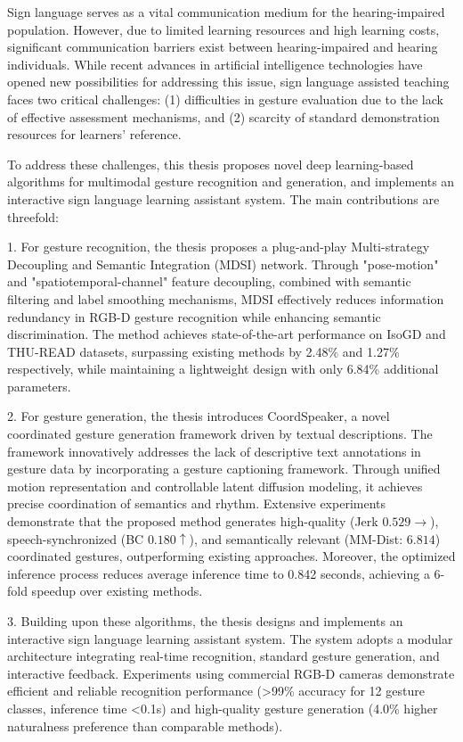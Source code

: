 \begin{abstract*}
Sign language serves as a vital communication medium for the hearing-impaired population. However, due to limited learning resources and high learning costs, significant communication barriers exist between hearing-impaired and hearing individuals. While recent advances in artificial intelligence technologies have opened new possibilities for addressing this issue, sign language assisted teaching faces two critical challenges: (1) difficulties in gesture evaluation due to the lack of effective assessment mechanisms, and (2) scarcity of standard demonstration resources for learners' reference.

To address these challenges, this thesis proposes novel deep learning-based algorithms for multimodal gesture recognition and generation, and implements an interactive sign language learning assistant system. The main contributions are threefold:

1. For gesture recognition, the thesis proposes a plug-and-play Multi-strategy Decoupling and Semantic Integration (MDSI) network. Through "pose-motion" and "spatiotemporal-channel" feature decoupling, combined with semantic filtering and label smoothing mechanisms, MDSI effectively reduces information redundancy in RGB-D gesture recognition while enhancing semantic discrimination. The method achieves state-of-the-art performance on IsoGD and THU-READ datasets, surpassing existing methods by 2.48\% and 1.27\% respectively, while maintaining a lightweight design with only 6.84\% additional parameters.

2. For gesture generation, the thesis introduces CoordSpeaker, a novel coordinated gesture generation framework driven by textual descriptions. The framework innovatively addresses the lack of descriptive text annotations in gesture data by incorporating a gesture captioning framework. Through unified motion representation and controllable latent diffusion modeling, it achieves precise coordination of semantics and rhythm. Extensive experiments demonstrate that the proposed method generates high-quality (Jerk $0.529\rightarrow$), speech-synchronized (BC $0.180\uparrow$), and semantically relevant (MM-Dist: $6.814$) coordinated gestures, outperforming existing approaches. Moreover, the optimized inference process reduces average inference time to 0.842 seconds, achieving a 6-fold speedup over existing methods.

3. Building upon these algorithms, the thesis designs and implements an interactive sign language learning assistant system. The system adopts a modular architecture integrating real-time recognition, standard gesture generation, and interactive feedback. Experiments using commercial RGB-D cameras demonstrate efficient and reliable recognition performance (>99\% accuracy for 12 gesture classes, inference time <0.1s) and high-quality gesture generation (4.0\% higher naturalness preference than comparable methods). 


\end{abstract*}
